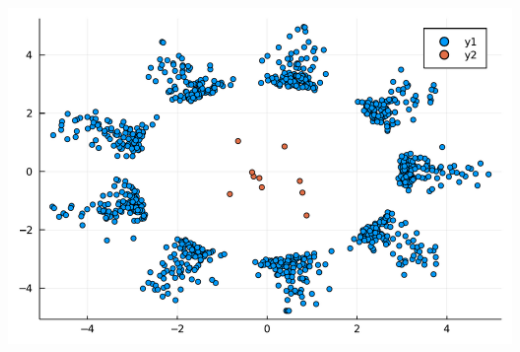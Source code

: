 \documentclass[12pt,a4paper]{article}
\begin{document}
\includegraphics[width=\linewidth]{jl_uOl600/test1_9_1.pdf}
\end{document}
